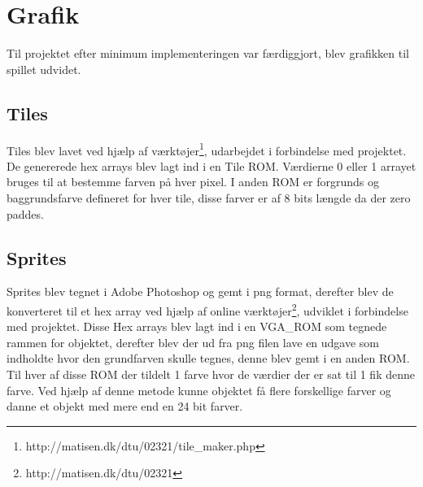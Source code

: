 \section{Grafik}
Til projektet efter minimum implementeringen var færdiggjort, blev grafikken til spillet udvidet. 


\subsection{Tiles}
Tiles blev lavet ved hjælp af værktøjer\footnote{http://matisen.dk/dtu/02321/tile\_maker.php}, udarbejdet i forbindelse med projektet. De genererede hex arrays blev lagt ind i en Tile ROM. Værdierne 0 eller 1 arrayet bruges til at bestemme farven på hver pixel. I anden ROM er forgrunds og baggrundsfarve defineret for hver tile, disse farver er af 8 bits længde da der zero paddes.

\subsection{Sprites}
Sprites blev tegnet i Adobe Photoshop og gemt i png format, derefter blev de konverteret til et hex array ved hjælp af online værktøjer\footnote{http://matisen.dk/dtu/02321}, udviklet i forbindelse med projektet. Disse Hex arrays blev lagt ind i en VGA\_ROM som tegnede rammen for objektet, derefter blev der ud fra png filen lave en udgave som indholdte hvor den grundfarven skulle tegnes, denne blev gemt i en anden ROM. Til hver af disse ROM der tildelt 1 farve hvor de værdier der er sat til 1 fik denne farve. Ved hjælp af denne metode kunne objektet få flere forskellige farver og danne et objekt med mere end en 24 bit farver.